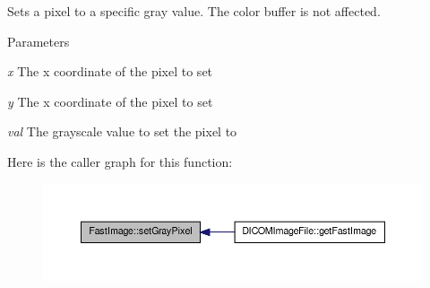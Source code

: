 \label{class_fast_image_a1e0ef4ac5b61cc6d96c9cd9c4bada344}
Sets a pixel to a specific gray value. The color buffer is not affected. 
\begin{DoxyParams}{Parameters}
\item[{\em x}]The x coordinate of the pixel to set \item[{\em y}]The x coordinate of the pixel to set \item[{\em val}]The grayscale value to set the pixel to \end{DoxyParams}


Here is the caller graph for this function:
\nopagebreak
\begin{figure}[H]
\begin{center}
\leavevmode
\includegraphics[width=400pt]{class_fast_image_a1e0ef4ac5b61cc6d96c9cd9c4bada344_icgraph}
\end{center}
\end{figure}


